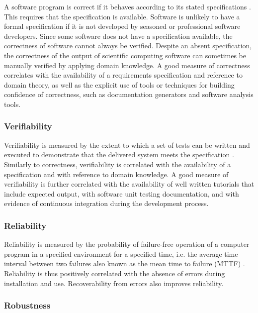 \documentclass[12pt, notitlepage]{article}
\begin{document}
 A software program is correct if it behaves according to its stated
specifications \citep{GhezziEtAl2003}. This requires that the specification is available. Software is unlikely to have a formal specification if it is not developed by seasoned or professional software developers. Since some software does not have a specification available, the correctness of software cannot always be verified. Despite an absent specification, the correctness of the output of scientific computing software can sometimes be manually verified by applying domain knowledge. A good measure of correctness correlates with the availability of a requirements specification and reference to domain theory, as well as the explicit use of tools or techniques for building confidence of correctness, such as documentation generators and software analysis tools.

\subsubsection{Verifiability}

Verifiability is measured by the extent to which a set of tests can be written and executed to demonstrate that the delivered system meets the specification \citep{sommerville}. Similarly to correctness, verifiability is correlated with the availability of a specification and with reference to domain knowledge. A good measure of verifiability is further correlated with the availability of well written tutorials that include expected output, with software unit testing documentation, and with evidence of continuous integration during the development process. 

\subsubsection{Reliability}

Reliability is measured by the probability of failure-free operation of a computer program in a specified environment for a specified time, i.e. the average time interval between two failures also known as the mean time to failure (MTTF) \citep{GhezziEtAl2003} \citep{musa1987software}. Reliability is thus positively correlated with the absence of errors during installation and use. Recoverability from errors also improves reliability.

\subsubsection{Robustness}
\end{document}
